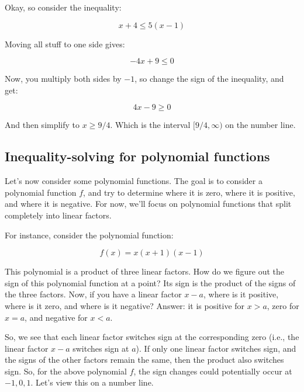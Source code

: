 \documentclass{amsart}
\begin{document}
Okay, so consider the inequality:

\begin{equation*}
  x + 4 \le 5(x - 1)
\end{equation*}

Moving all stuff to one side gives:

\begin{equation*}
 -4x + 9 \le 0
\end{equation*}

Now, you multiply both sides by $-1$, so change the sign of the inequality, and get:

\begin{equation*}
  4x - 9 \ge 0
\end{equation*}

And then simplify to $x \ge 9/4$. Which is the interval $[9/4,\infty)$ on the number line.


\subsection*{Inequality-solving for polynomial functions}

Let's now consider some polynomial functions. The goal is to consider
a polynomial function $f$, and try to determine where it is zero,
where it is positive, and where it is negative. For now, we'll focus
on polynomial functions that split completely into linear factors.

For instance, consider the polynomial function:

\begin{equation*}
  f(x) = x(x+1)(x-1)
\end{equation*}

This polynomial is a product of three linear factors. How do we figure
out the sign of this polynomial function at a point? Its sign is the
product of the signs of the three factors. Now, if you have a linear
factor $x - a$, where is it positive, where is it zero, and where is
it negative? Answer: it is positive for $x > a$, zero for $x = a$, and
negative for $x < a$.

So, we see that each linear factor switches sign at the corresponding
zero (i.e., the linear factor $x - a$ switches sign at $a$). If only
one linear factor switches sign, and the signs of the other factors
remain the same, then the product also switches sign. So, for the above
polynomial $f$, the sign changes could potentially occur at
$-1,0,1$. Let's view this on a number line.
\end{document}
